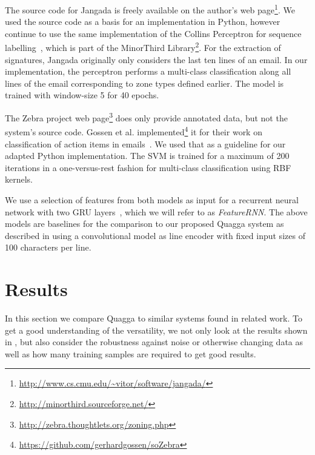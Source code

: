 \documentclass{llncs}
\begin{document}
The source code for Jangada is freely available on the author's web page\footnote{\url{http://www.cs.cmu.edu/~vitor/software/jangada/}}.
We used the source code as a basis for an implementation in Python, however continue to use the same implementation of the Collins Perceptron for sequence labelling~\cite{cperceptron}, which is part of the MinorThird Library\footnote{\url{http://minorthird.sourceforge.net/}}.
For the extraction of signatures, Jangada originally only considers the last ten lines of an email.
In our implementation, the perceptron performs a multi-class classification along all lines of the email corresponding to zone types defined earlier.
The model is trained with window-size 5 for 40 epochs.

The Zebra project web page\footnote{\url{http://zebra.thoughtlets.org/zoning.php}} does only provide annotated data, but not the system's source code. 
Gossen et al. implemented\footnote{\url{https://github.com/gerhardgossen/soZebra}} it for their work on classification of action items in emails~\cite{sozebra}.
We used that as a guideline for our adapted Python implementation.
The SVM is trained for a maximum of 200 iterations in a one-versus-rest fashion for multi-class classification using RBF kernels.


We use a selection of features from both models as input for a recurrent neural network with two GRU layers~\cite{gru}, which we will refer to as \textit{FeatureRNN}.
The above models are baselines for the comparison to our proposed Quagga system as described in  using a convolutional model as line encoder with fixed input sizes of 100 characters per line.



\section{Results}
In this section we compare Quagga to similar systems found in related work.
To get a good understanding of the versatility, we not only look at the results shown in , but also consider the robustness against noise or otherwise changing data as well as how many training samples are required to get good results.
\end{document}
